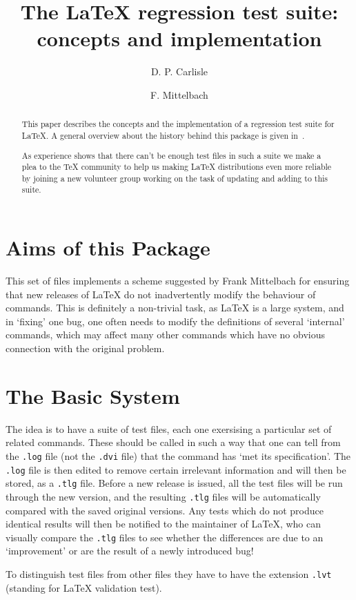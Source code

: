 \documentclass{ltugboat}
\title{The \LaTeX{} regression test suite: concepts and
implementation}
\author{D. P. Carlisle \and  F. Mittelbach}
\begin{document}
\maketitle

\begin{abstract}
  This paper describes the concepts and the implementation of a
  regression test suite for \LaTeX{}. A general overview about the
  history behind this package is given in~\cite{tub:xxx}.

  As experience shows that there can't be enough test files in such a
  suite we make a plea to the \TeX{} community to help us making
  \LaTeX{} distributions even more reliable by joining a new volunteer
  group working on the task of updating and adding to this suite.
\end{abstract}

\section{Aims of this Package}
This set of files implements a scheme suggested by Frank Mittelbach
for ensuring that new releases of \LaTeX{} do not inadvertently modify
the behaviour of commands. This is definitely a non-trivial task, as
\LaTeX{} is a large system, and in `fixing' one bug, one often needs
to modify the definitions of several `internal' commands, which may
affect many other commands which have no obvious connection with the
original problem.

\section{The Basic System}
The idea is to have a suite of test files, each one exersising a
particular set of related commands. These should be called in such a
way that one can tell from the \texttt{.log} file (not the \texttt{.dvi}
file) that the command has `met its specification'. The \texttt{.log}
file is then edited to remove certain irrelevant information and will
then be stored, as a \texttt{.tlg} file. Before a new release is issued,
all the test files will be run through the new version, and the
resulting \texttt{.tlg} files will be automatically compared with the
saved original versions. Any tests which do not produce identical
results will then be notified to the maintainer of
\LaTeX, who can visually compare the \texttt{.tlg} files to see whether the
differences are due to an `improvement' or are the result of a newly
introduced bug! 

To distinguish test files from other files they have to have the
extension \texttt{.lvt} (standing for \LaTeX{} validation test). 
\end{document}

